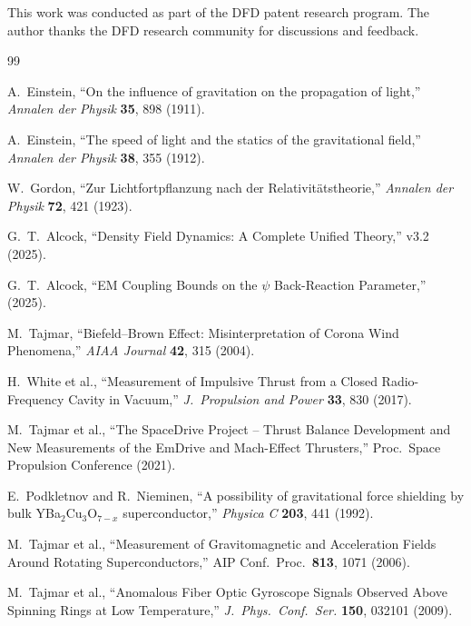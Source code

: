 \documentclass[aps,prd,twocolumn,superscriptaddress,floatfix,nofootinbib]{revtex4-2}
\begin{document}
\begin{acknowledgments}
This work was conducted as part of the DFD patent research program.
The author thanks the DFD research community for discussions and feedback.
\end{acknowledgments}

\begin{thebibliography}{99}

A.~Einstein, ``On the influence of gravitation on the propagation of light,''
\textit{Annalen der Physik} \textbf{35}, 898 (1911).

A.~Einstein, ``The speed of light and the statics of the gravitational field,''
\textit{Annalen der Physik} \textbf{38}, 355 (1912).

W.~Gordon, ``Zur Lichtfortpflanzung nach der Relativit\"atstheorie,''
\textit{Annalen der Physik} \textbf{72}, 421 (1923).

G.~T.~Alcock, ``Density Field Dynamics: A Complete Unified Theory,'' v3.2 (2025).

G.~T.~Alcock, ``EM Coupling Bounds on the $\psi$ Back-Reaction Parameter,'' (2025).

M.~Tajmar, ``Biefeld--Brown Effect: Misinterpretation of Corona Wind Phenomena,''
\textit{AIAA Journal} \textbf{42}, 315 (2004).

H.~White et al., ``Measurement of Impulsive Thrust from a Closed Radio-Frequency
Cavity in Vacuum,'' \textit{J.\ Propulsion and Power} \textbf{33}, 830 (2017).

M.~Tajmar et al., ``The SpaceDrive Project -- Thrust Balance Development
and New Measurements of the EmDrive and Mach-Effect Thrusters,''
Proc.\ Space Propulsion Conference (2021).

E.~Podkletnov and R.~Nieminen, ``A possibility of gravitational force
shielding by bulk YBa$_2$Cu$_3$O$_{7-x}$ superconductor,''
\textit{Physica C} \textbf{203}, 441 (1992).

M.~Tajmar et al., ``Measurement of Gravitomagnetic and Acceleration Fields
Around Rotating Superconductors,'' AIP Conf.\ Proc.\ \textbf{813}, 1071 (2006).

M.~Tajmar et al., ``Anomalous Fiber Optic Gyroscope Signals Observed Above
Spinning Rings at Low Temperature,''
\textit{J.\ Phys.\ Conf.\ Ser.} \textbf{150}, 032101 (2009).


\end{thebibliography}
\end{document}
